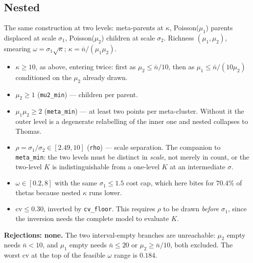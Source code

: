 \documentclass[11pt]{article}
\newcommand{\nb}{\bar n}
\newcommand{\code}[1]{\texttt{#1}}
\begin{document}
\subsection*{Nested}
The same construction at two levels: meta-parents at $\kappa$, Poisson($\mu_1$) parents displaced at scale $\sigma_1$, Poisson($\mu_2$) children at scale $\sigma_2$. Richness $(\mu_1,\mu_2)$, smearing $\omega=\sigma_1\sqrt\kappa$; $\kappa=\nb/(\mu_1\mu_2)$.
\begin{itemize}
  \item $\kappa\ge10$, as above, entering twice: first as $\mu_2\le\nb/10$, then as $\mu_1\le\nb/(10\mu_2)$ conditioned on the $\mu_2$ already drawn.
  \item $\mu_2\ge1$ (\code{mu2\_min}) --- children per parent.
  \item $\mu_1\mu_2\ge2$ (\code{meta\_min}) --- at least two points per meta-cluster. Without it the outer level is a degenerate relabelling of the inner one and nested collapses to Thomas.
  \item $\rho=\sigma_1/\sigma_2\in[2.49,10]$ (\code{rho}) --- scale separation. The companion to \code{meta\_min}: the two levels must be distinct in \emph{scale}, not merely in count, or the two-level $K$ is indistinguishable from a one-level $K$ at an intermediate $\sigma$.
  \item $\omega\in[0.2,8]$ with the same $\sigma_1\le1.5$ cost cap, which here bites for $70.4\%$ of thetas because nested $\kappa$ runs lower.
  \item $\mathrm{cv}\le0.30$, inverted by \code{cv\_floor}. This requires $\rho$ to be drawn \emph{before} $\sigma_1$, since the inversion needs the complete model to evaluate $K$.
\end{itemize}
\textbf{Rejections: none.} The two interval-empty branches are unreachable: $\mu_2$ empty needs $\nb<10$, and $\mu_1$ empty needs $\nb\le20$ or $\mu_2\ge\nb/10$, both excluded. The worst cv at the top of the feasible $\omega$ range is $0.184$.
\end{document}
